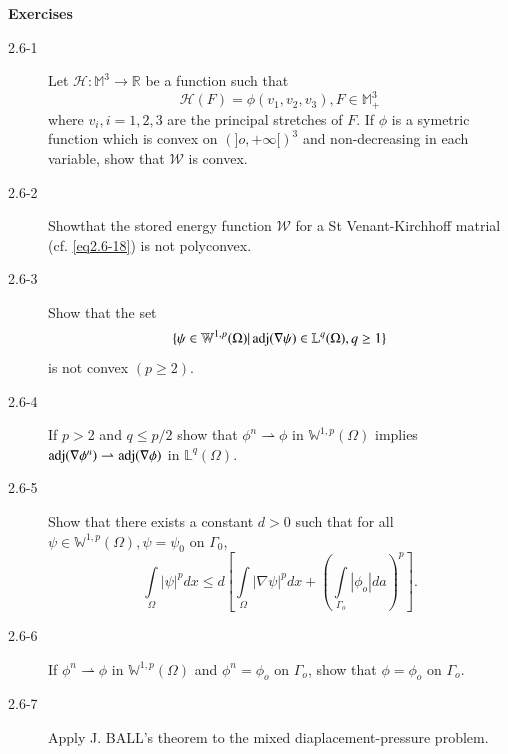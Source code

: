 \smallskip
\begin{center}
{\large\bf Exercises}
\end{center}

\begin{description}
\item[2.6-1] Let $\mathscr{H}:\mathbb{M}^3 \to \mathbb{R}$ be a
  function such that 
  $$
  \mathcal{H}(F)= \phi (v_1, v_2, v_3), F \in \mathbb{M}^3_+
  $$
  where $v_i, i=1, 2, 3$ are the principal stretches of $F$. If $\phi$
  is a symetric function which is convex on $(]o, + \infty [)^3$ and
    non-decreasing in each variable, show that $\mathcal{W}$ is
    convex.  

\item[2.6-2] Show\pageoriginale that the stored energy function $\mathcal{W}$
  for a St Venant-Kirchhoff  matrial (cf. \eqref{eq2.6-18}) is not
  polyconvex.  

\item[2.6-3] Show that the set
$$
\{\psi \in \mathbb{W}^{1,p}(\Omega)| \operatorname{adj} (\nabla \psi) \in
\mathbb{L}^q (\Omega),q \geq 1 \} 
$$
is not convex $(p \geq 2)$. 

\item[2.6-4] If $p >2$ and $q \leq p/2$ show that $\phi^n
  \rightharpoonup \phi$ in $\mathbb{W}^{1,p}(\Omega)$ implies $\operatorname{adj}
  (\nabla \phi^n)\rightharpoonup \operatorname{adj} (\nabla \phi)$ in
  $\mathbb{L}^q(\Omega)$.  

\item[2.6-5] Show that there exists a constant $d>0$ such that for
  all $\psi \in \mathbb{W}^{1,p}(\Omega), \psi =\psi_0$ on $\Gamma_0$, 
  $$
  \int \limits_\Omega |\psi|^p dx \leq d\left[\int \limits_ \Omega
    |\nabla \psi|^p dx + \left(\int \limits_{\Gamma _o} |\phi_o|
    da\right)^p\right].  
  $$

\item[2.6-6] If $\phi^n \rightharpoonup \phi $ in
  $\mathbb{W}^{1,p}(\Omega)$ and $\phi^n =\phi_o$ on $\Gamma_o$, show
  that $\phi = \phi_o$ on $\Gamma_o$.  

\item[2.6-7] Apply J. BALL's theorem to the mixed
  diaplacement-pressure problem.


\end{description}

